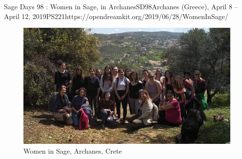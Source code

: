 \begin{event}{Sage Days 98 : Women in Sage, in Archanes}{SD98}{Archanes (Greece), April 8 -- April 12, 2019}{PS}{22}{1}{https://opendreamkit.org/2019/06/28/WomenInSage/}
\begin{figure}[ht]
  \includegraphics[width=.75\textwidth]{group_photo_head.jpeg}
  \caption*{Women in Sage, Archanes, Crete}
\end{figure}



\end{event}
